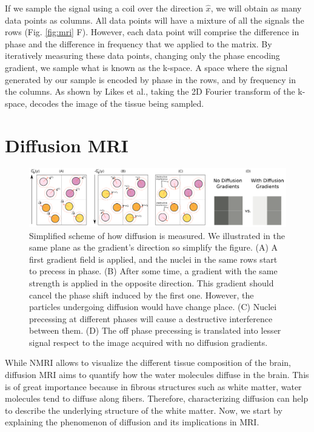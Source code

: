 If we sample the signal using a coil over the direction $\hat x$, we will obtain
as many data points as columns. All data points will have a mixture of all
the signals the rows (Fig. \ref{fig:mri} F).
However, each data point will comprise the difference in phase and the
difference in frequency that we applied to the matrix. By iteratively
measuring these data points, changing only the phase encoding gradient, we
sample what is known as the k-space\cite{Likes1981}. A space where the signal
generated by our sample is encoded by phase in the rows, and by frequency in the
columns. As shown by Likes et al.\cite{Likes1981}, taking the 2D Fourier
transform of the k-space, decodes the image of the tissue being sampled.

\section{Diffusion MRI}

\begin{figure}[t]
    \includegraphics[width=\textwidth]{3.mri/img/diffusion.png}
    \caption{Simplified scheme of how diffusion is measured. We illustrated
             in the same plane as the gradient's direction so simplify the figure.
             (A) A first gradient field is applied, and the nuclei in the same
             rows start to precess in phase. (B) After some time, a gradient
             with the same strength is applied in the opposite direction. This
             gradient should cancel the phase shift induced by the first one.
             However, the particles undergoing diffusion would have change
             place. (C) Nuclei precessing at different phases will cause a
             destructive interference between them. (D) The off phase precessing
             is translated into lesser signal respect to the image acquired with
             no diffusion gradients.}
     \label{fig:diffusion_gradient}
\end{figure}

While NMRI allows to visualize the different tissue composition of the brain,
diffusion MRI aims to quantify how the water molecules diffuse in the brain.
This is of great importance because in fibrous structures such as white matter,
water molecules tend to diffuse along fibers. Therefore, characterizing diffusion
can help to describe the underlying structure of the white matter. Now, we
start by explaining the phenomenon of diffusion and its implications in MRI.

